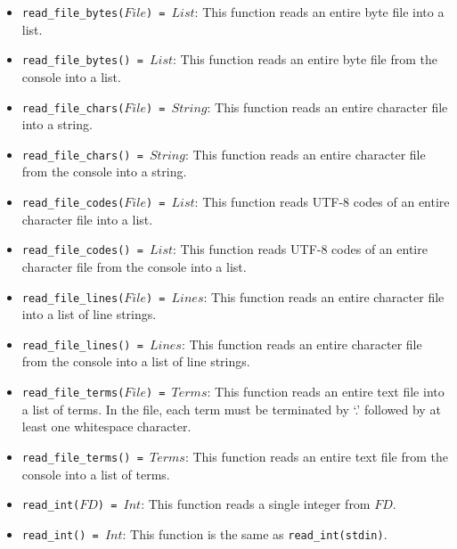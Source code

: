 \begin{itemize}
\item \texttt{read\_file\_bytes($File$) = $List$}: This function reads an entire byte file into a list. 
\item \texttt{read\_file\_bytes() = $List$}: This function reads an entire byte file from the console into a list.
\item \texttt{read\_file\_chars($File$) = $String$}: This function reads an entire character file into a string. 
\item \texttt{read\_file\_chars() = $String$}: This function reads an entire character file from the console into a string. 
\item \texttt{read\_file\_codes($File$) = $List$}: This function reads UTF-8 codes of an entire character file into a list. 
\item \texttt{read\_file\_codes() = $List$}: This function reads UTF-8 codes of an entire character file from the console into a list. 
\item \texttt{read\_file\_lines($File$) = $Lines$}: This function reads an entire character file into a list of line strings.  
\item \texttt{read\_file\_lines() = $Lines$}: This function reads an entire character file from the console into a list of line strings.  
\item \texttt{read\_file\_terms($File$) = $Terms$}: This function reads an entire text file into a list of terms. In the file, each term must be terminated by `.' followed by at least one whitespace character.
\item \texttt{read\_file\_terms() = $Terms$}: This function reads an entire text file from the console into a list of terms.

\item \texttt{read\_int($FD$) = $Int$}: This function reads a single integer from $FD$. 

\item \texttt{read\_int() = $Int$}: This function is the same as \texttt{read\_int(stdin)}.


\end{itemize}
